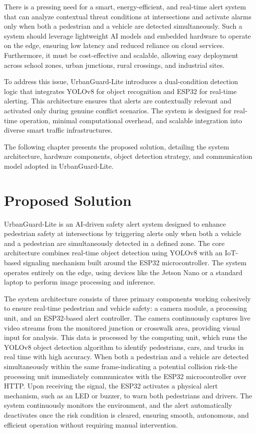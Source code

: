 \documentclass[a4paper, 12pt]{report}
\begin{document}
There is a pressing need for a smart, energy-efficient, and real-time alert system that can analyze contextual threat conditions at intersections and activate alarms only when both a pedestrian and a vehicle are detected simultaneously. Such a system should leverage lightweight AI models and embedded hardware to operate on the edge, ensuring low latency and reduced reliance on cloud services. Furthermore, it must be cost-effective and scalable, allowing easy deployment across school zones, urban junctions, rural crossings, and industrial sites.

To address this issue, UrbanGuard-Lite introduces a dual-condition detection logic that integrates YOLOv8 for object recognition and ESP32 for real-time alerting. This architecture ensures that alerts are contextually relevant and activated only during genuine conflict scenarios. The system is designed for real-time operation, minimal computational overhead, and scalable integration into diverse smart traffic infrastructures.

The following chapter presents the proposed solution, detailing the system architecture, hardware components, object detection strategy, and communication model adopted in UrbanGuard-Lite.


\section{Proposed Solution}

UrbanGuard-Lite is an AI-driven safety alert system designed to enhance pedestrian safety at intersections by triggering alerts only when both a vehicle and a pedestrian are simultaneously detected in a defined zone. The core architecture combines real-time object detection using YOLOv8 with an IoT-based signaling mechanism built around the ESP32 microcontroller. The system operates entirely on the edge, using devices like the Jetson Nano or a standard laptop to perform image processing and inference.

The system architecture consists of three primary components working cohesively to ensure real-time pedestrian and vehicle safety: a camera module, a processing unit, and an ESP32-based alert controller. The camera continuously captures live video streams from the monitored junction or crosswalk area, providing visual input for analysis. This data is processed by the computing unit, which runs the YOLOv8 object detection algorithm to identify pedestrians, cars, and trucks in real time with high accuracy. When both a pedestrian and a vehicle are detected simultaneously within the same frame-indicating a potential collision risk-the processing unit immediately communicates with the ESP32 microcontroller over HTTP. Upon receiving the signal, the ESP32 activates a physical alert mechanism, such as an LED or buzzer, to warn both pedestrians and drivers. The system continuously monitors the environment, and the alert automatically deactivates once the risk condition is cleared, ensuring smooth, autonomous, and efficient operation without requiring manual intervention.
\end{document}
